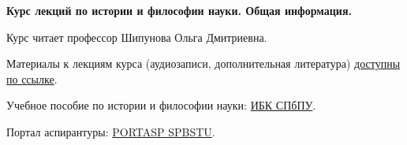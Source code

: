 \documentclass[main.tex]{subfiles}
\begin{document}
{\parindent0pt

\textbf{Курс лекций по истории и философии науки. Общая информация.}

Курс читает профессор Шипунова Ольга Дмитриевна.

Материалы к лекциям курса (аудиозаписи, дополнительная литература) \href{https://drive.google.com/drive/folders/1iSx2EjJJ98rhPpOsM4xGcJA7-7qitQHM?usp=sharing}{доступны по ссылке}.

Учебное пособие по истории и философии науки: \href{https://elib.spbstu.ru/dl/5/tr/2022/tr22-155.pdf/download/tr22-155.pdf}{ИБК СПбПУ}.

Портал аспирантуры: \href{https://portasp.spbstu.ru/login/index.php}{PORTASP SPBSTU}.

}
\end{document}
